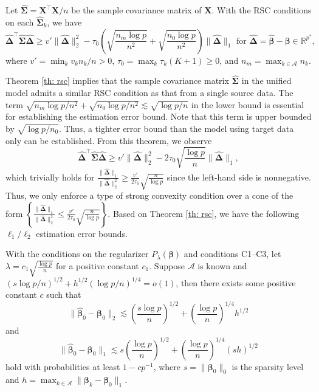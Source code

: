 \documentclass[twoside,12pt]{article}
\newcommand{\mb}[1]{\boldsymbol{\mathbf{#1}}}
\newcommand{\wh}[1]{\widehat{#1}}
\begin{document}
    \begin{theorem}
    	\label{th: rsc}
    	Let $\wh{\mb\Sigma}=\mb X^\top\mb X/n$ be the sample covariance matrix of $\mb X$.
    	With the RSC conditions on each $\wh{\mb\Sigma}_k$, we have	
    	\begin{equation*}
    		\label{eq: rsc2}
    	\wh{\mb\Delta}^\top\wh{\mb\Sigma}\wh{\mb\Delta}\geq v'\|\wh{\boldsymbol{\Delta}}\|_{2}^{2}-\tau_0 \left(\sqrt{\frac{n_m\log p}{n^2}}+\sqrt{\frac{n_0\log p}{n^2}}\right)\|\wh{\boldsymbol{\Delta}}\|_{1} \text { for } \wh{\mb\Delta}=\wh{\mb\beta}-\mb\beta \in \mathbb{R}^{p^*},
    	\end{equation*}
    where $v'=\min_k v_k n_k/n>0$, $\tau_0=\max_k \tau_k (K+1)\geq 0$, and $n_m=\max_{k\in\mathcal A}n_k$.
    \end{theorem}

    Theorem \ref{th: rsc} implies that the sample covariance matrix $\wh{\mb\Sigma}$ in the unified model admits a similar RSC condition as that from a single source data.
    The term $\sqrt{n_m\log p/n^2}+\sqrt{n_0\log p/n^2}\lesssim \sqrt{\log p/n}$ in the lower bound is essential for establishing the estimation error bound.
    Note that this term is upper bounded by $\sqrt{\log p/n_0}$.
    Thus, a tighter error bound than the model using target data only can be established.
    From this theorem, we observe
    $$\wh{\mb\Delta}^\top\wh{\mb\Sigma}\wh{\mb\Delta}\geq v'\|\wh{\boldsymbol{\Delta}}\|_{2}^{2}-2\tau_0 \sqrt{\frac{\log p}{n}}\|\wh{\boldsymbol{\Delta}}\|_{1},$$
    which trivially holds for $\frac{\|\wh{\boldsymbol{\Delta}}\|_{1}}{\|\wh{\boldsymbol{\Delta}}\|_2^2}\geq \frac{v'}{2\tau_0}\sqrt{\frac n{\log p}}$ since the left-hand side is nonnegative.
    Thus, we only enforce a type of strong convexity condition over a cone of the form $\left\{\frac{\|\wh{\boldsymbol{\Delta}}\|_{1}}{\|\wh{\boldsymbol{\Delta}}\|_2^2}\leq \frac{v'}{2\tau_0}\sqrt{\frac n{\log p}}\right\}$. 
    Based on Theorem \ref{th: rsc}, we have the following $\ell_1/\ell_2$ estimation error bounds.
    
	
	\begin{theorem}
	\label{th: error1}
	With the conditions on the regularizer $P_{\lambda}(\mb\beta)$ and conditions C1--C3, let $\lambda=c_1\sqrt{\frac{\log p}{n}}$ for a positive constant $c_1$. 
	Suppose $\mathcal A$ is known and $(s\log p/n)^{1/2}+h^{1/2}(\log p/n)^{1/4}=o(1)$,
	then there exists some positive constant $c$ such that 
	$$
	\|\wh{\mb\beta}_0-\mb\beta_0\|_{2} \lesssim \left(\frac{s\log p}{n}\right)^{1/2}+\left(\frac{\log p}{n}\right)^{1/4}h^{1/2}
	$$
	and
	$$
	\|\wh{\mb\beta}_0-\mb\beta_0\|_{1} \lesssim s\left(\frac{\log p}{n}\right)^{1/2}+\left(\frac{\log p}{n}\right)^{1/4}\left(sh\right)^{1/2}
	$$
	hold with probabilities at least $1-cp^{-1}$,
	where $s=\|\mb\beta_0\|_0$ is the sparsity level and $h=\max_{k\in\mathcal A} \|\mb\beta_k-\mb\beta_0\|_1$.
\end{theorem}
\end{document}
